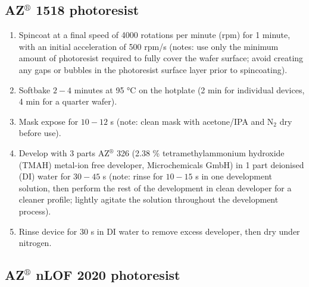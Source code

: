 \documentclass[
  a4paper,
]{scrbook}
\begin{document}
\hypertarget{azcircledr-1518-photoresist}{%
\subsection{\texorpdfstring{AZ\(^\circledR\) 1518
photoresist}{AZ\^{}\textbackslash circledR 1518 photoresist}}\label{azcircledr-1518-photoresist}}

\begin{enumerate}
\def\labelenumi{\arabic{enumi}.}
\item
  Spincoat at a final speed of 4000 rotations per minute (rpm) for 1
  minute, with an initial acceleration of 500 rpm/s (notes: use only the
  minimum amount of photoresist required to fully cover the wafer
  surface; avoid creating any gaps or bubbles in the photoresist surface
  layer prior to spincoating).
\item
  Softbake \(2-4\) minutes at 95 °C on the hotplate (2 min for
  individual devices, 4 min for a quarter wafer).
\item
  Mask expose for \(10-12\) s (note: clean mask with acetone/IPA and
  N\(_2\) dry before use).
\item
  Develop with 3 parts AZ\(^\circledR\) 326 (2.38 \% tetramethylammonium
  hydroxide (TMAH) metal-ion free developer, Microchemicals GmbH) in 1
  part deionised (DI) water for \(30-45\) s (note: rinse for \(10-15\) s
  in one development solution, then perform the rest of the development
  in clean developer for a cleaner profile; lightly agitate the solution
  throughout the development process).
\item
  Rinse device for 30 s in DI water to remove excess developer, then dry
  under nitrogen.
\end{enumerate}

\hypertarget{azcircledr-nlof-2020-photoresist}{%
\subsection{\texorpdfstring{AZ\(^\circledR\) nLOF 2020
photoresist}{AZ\^{}\textbackslash circledR nLOF 2020 photoresist}}\label{azcircledr-nlof-2020-photoresist}}
\end{document}
